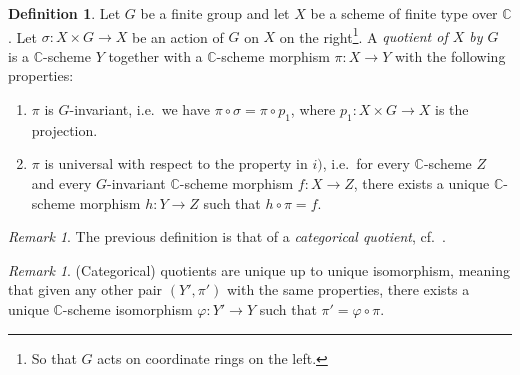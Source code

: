 \documentclass[12pt,a4paper]{amsart}
\theoremstyle{plain}
\theoremstyle{definition}
\newtheorem{defn}[thm]{Definition}
\theoremstyle{remark}
\newtheorem{rem}[thm]{Remark}
\begin{document}
\begin{defn}
  Let $G$ be a finite group and let $X$ be a scheme of finite type over $\mathbb{C}$.
  Let $\sigma \colon X \times G \to X$ be an action of $G$ on $X$ on the right\footnote{So that $G$ acts on coordinate rings on the left.}.
  A \textit{quotient of $X$ by $G$} is a $\mathbb{C}$-scheme $Y$ together with a $\mathbb{C}$-scheme morphism $\pi \colon X \to Y$ with the following properties:
  \begin{enumerate}[label=\roman*)]
    \item $\pi$ is $G$-invariant, i.e.~we have $\pi \circ \sigma = \pi \circ p_{1}$, where $p_{1} \colon X \times G \to X$ is the projection.
    \item $\pi$ is universal with respect to the property in $i)$, i.e.~for every $\mathbb{C}$-scheme $Z$ and every $G$-invariant $\mathbb{C}$-scheme morphism $f \colon X \to Z$, there exists a unique $\mathbb{C}$-scheme morphism $h \colon Y \to Z$ such that $h \circ \pi = f$.
  \end{enumerate}
\end{defn}

\begin{rem}
  The previous definition is that of a \textit{categorical quotient}, cf.~\cite[Definition 0.5]{mfk94}.
\end{rem}

\begin{rem}
  (Categorical) quotients are unique up to unique isomorphism, meaning that given any other pair $(Y', \pi')$ with the same properties, there exists a unique $\mathbb{C}$-scheme isomorphism $\varphi \colon Y' \to Y$ such that $\pi' = \varphi \circ \pi$.
\end{rem}
\end{document}
